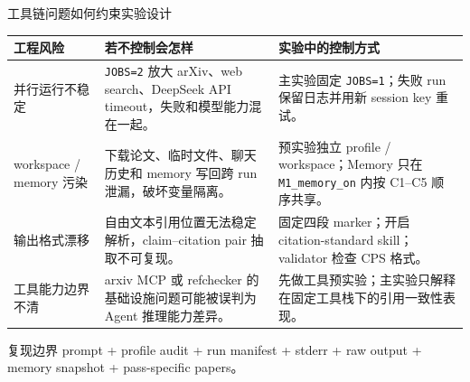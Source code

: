 \documentclass[UTF8,fontset=fandol,aspectratio=169]{ctexbeamer}
\begin{document}
\begin{frame}{工具链问题如何约束实验设计}
  \scriptsize
  \begin{tabularx}{\textwidth}{@{}p{}XX@{}}
    \toprule
    工程风险 & 若不控制会怎样 & 实验中的控制方式 \\
    \midrule
    并行运行不稳定 &
    \texttt{JOBS=2} 放大 arXiv、web search、DeepSeek API timeout，失败和模型能力混在一起。 &
    主实验固定 \texttt{JOBS=1}；失败 run 保留日志并用新 session key 重试。 \\
    workspace / memory 污染 &
    下载论文、临时文件、聊天历史和 memory 写回跨 run 泄漏，破坏变量隔离。 &
    预实验独立 profile / workspace；Memory 只在 \texttt{M1\_memory\_on} 内按 C1--C5 顺序共享。 \\
    输出格式漂移 &
    自由文本引用位置无法稳定解析，claim--citation pair 抽取不可复现。 &
    固定四段 marker；开启 citation-standard skill；validator 检查 CPS 格式。 \\
    工具能力边界不清 &
    arxiv MCP 或 refchecker 的基础设施问题可能被误判为 Agent 推理能力差异。 &
    先做工具预实验；主实验只解释在固定工具栈下的引用一致性表现。 \\
    \bottomrule
  \end{tabularx}

  \vspace{0.35em}
  \begin{alertblock}{复现边界}
    prompt + profile audit + run manifest + stderr + raw output + memory snapshot + pass-specific papers。
  \end{alertblock}
\end{frame}
\end{document}

